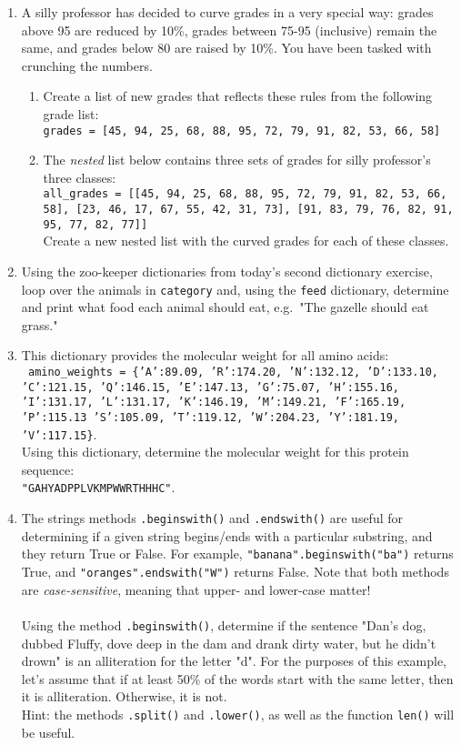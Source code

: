 \documentclass{article}[12pt]
\newcommand{\code}[1]{\texttt{#1}}  %
\begin{document}
\begin{enumerate}[itemsep=5ex]
	
	\item A silly professor has decided to curve grades in a very special way: grades above 95 are reduced by 10\%, grades between 75-95 (inclusive) remain the same, and grades below 80 are raised by 10\%. You have been tasked with crunching the numbers.
	
	\begin{enumerate}[itemsep=2ex]
		\item Create a list of new grades that reflects these rules from the following grade list: \\
		\code{grades = [45, 94, 25, 68, 88, 95, 72, 79, 91, 82, 53, 66, 58]} 
		 
		\item The \emph{nested} list below contains three sets of grades for silly professor's three classes: \\ 
		\code{all\_grades = [[45, 94, 25, 68, 88, 95, 72, 79, 91, 82, 53, 66, 58], [23, 46, 17, 67, 55, 42, 31, 73], [91, 83, 79, 76, 82, 91, 95, 77, 82, 77]]}
		\\ Create a new nested list with the curved grades for each of these classes.
	\end{enumerate}
	
	\item Using the zoo-keeper dictionaries from today's second dictionary exercise, loop over the animals in \code{category} and, using the \code{feed} dictionary, determine and print what food each animal should eat, e.g.\ "The gazelle should eat grass." 

	\item This dictionary provides the molecular weight for all amino acids: \\ \code{ amino\_weights = \{'A':89.09, 'R':174.20, 'N':132.12, 'D':133.10, 'C':121.15, 'Q':146.15, 'E':147.13, 'G':75.07, 'H':155.16, 'I':131.17, 'L':131.17, 'K':146.19, 'M':149.21, 'F':165.19, 'P':115.13 'S':105.09, 'T':119.12, 'W':204.23, 'Y':181.19, 'V':117.15\}}. \\ Using this dictionary, determine the molecular weight for this protein sequence: \\ \code{"GAHYADPPLVKMPWWRTHHHC"}.
	
	\item The strings methods \code{.beginswith()} and \code{.endswith()} are useful for determining if a given string begins/ends with a particular substring, and they return True or False. For example, \code{"banana".beginswith("ba")} returns True, and \code{"oranges".endswith("W")} returns False. Note that both methods are \emph{case-sensitive}, meaning that upper- and lower-case matter! \\\\ Using the method \code{.beginswith()}, determine if the sentence "Dan's dog, dubbed Fluffy, dove deep in the dam and drank dirty water, but he didn't drown" is an alliteration for the letter "d". For the purposes of this example, let's assume that if at least 50\% of the words start with the same letter, then it is alliteration. Otherwise, it is not. 
	\\ Hint: the methods \code{.split()} and \code{.lower()}, as well as the function \code{len()} will be useful.


\end{enumerate}
\end{document}
